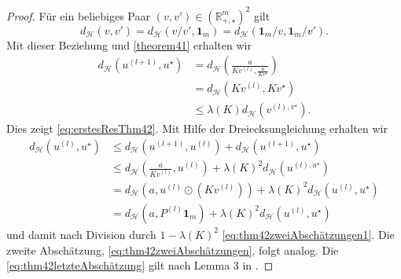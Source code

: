 \documentclass[11pt,a4paper]{article}
\newtheorem{remark}[theorem]{Bemerkung}
\numberwithin{equation}{section}
\begin{document}
	\begin{proof}
		Für ein beliebiges Paar $(v,v') \in (\mathbb{R}_{+,\star}^m)^2$ gilt
		\begin{equation*}
		d_\mathcal{H} (v,v') = d_\mathcal{H}(v/v',\boldsymbol{1}_m) = d_\mathcal{H}(\boldsymbol{1}_m/v,\boldsymbol{1}_m/v').
		\end{equation*}
		Mit dieser Beziehung und \autoref{theorem41} erhalten wir
		\begin{align*}
		d_\mathcal{H}(u^{(l+1)}, u^\star) &= d_\mathcal{H}\left(\frac{a}{Kv^{(l)},\frac{a}{Kv^\star}}\right)\\
		&=d_\mathcal{H}(Kv^{(l)}, Kv^\star) \\
		&\leq \lambda (K)d_\mathcal{H}(v^{(l),v^\star}).
		\end{align*}
		Dies zeigt \autoref{eq:erstesResThm42}. Mit Hilfe der Dreiecksungleichung erhalten wir
		\begin{align*}
		d_\mathcal{H}(u^{(l)}, u^\star) &\leq d_\mathcal{H}(u^{(l+1)},u^{(l)}) + d_\mathcal{H}(u^{(l+1)},u^\star)\\
		& \leq d_\mathcal{H}\left(\frac{a}{Kv^{(l)}}, u^{(l)}\right) + \lambda (K)^2 d_\mathcal{H}(u^{(l),u^\star})\\
		&= d_\mathcal{H}\left(a, u^{(l)} \odot (Kv^{(l)})\right) + \lambda (K)^2 d_\mathcal{H}(u^{(l)},u^\star)\\
		&= d_\mathcal{H}\left(a, P^{(l)}\boldsymbol{1}_m \right) + \lambda (K)^2 d_\mathcal{H}(u^{(l)},u^\star)
		\end{align*}
		und damit nach Division durch $1-\lambda(K)^2$  \autoref{eq:thm42zweiAbschätzungen1}. Die zweite Abschätzung, \autoref{eq:thm42zweiAbschätzungen}, folgt analog. 
		Die \autoref{eq:thm42letzteAbschätzung} gilt nach Lemma 3 in \cite{franklin_sinkhorn_convergence}.
	\end{proof}
	

\end{document}
